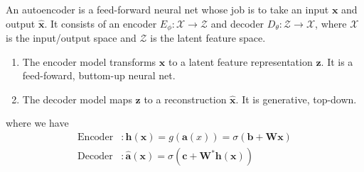 \documentclass{article}
\begin{document}
  \begin{definition}[Autoencoder]
    \label{def:autoencoder}
    An autoencoder is a feed-forward neural net whose job is to take an input $\mathbf{x}$ and output $\hat{\mathbf{x}}$. It consists of an encoder $E_\phi: \mathcal{X} \rightarrow \mathcal{Z}$ and decoder $D_\theta: \mathcal{Z} \rightarrow \mathcal{X}$, where $\mathcal{X}$ is the input/output space and $\mathcal{Z}$ is the latent feature space. 

    \begin{enumerate}
      \item The encoder model transforms $\mathbf{x}$ to a latent feature representation $\mathbf{z}$. It is a feed-foward, buttom-up neural net. 
      \item The decoder model maps $\mathbf{z}$ to a reconstruction $\hat{\mathbf{x}}$. It is generative, top-down. 
    \end{enumerate}
    where we have 
    \begin{align*} 
        \mathrm{Encoder} & : \mathbf{h}(\mathbf{x}) = g(\mathbf{a}(x)) = \sigma (\mathbf{b} + \mathbf{W} \mathbf{x}) \\
        \mathrm{Decoder} & : \hat{\mathbf{a}}(\mathbf{x}) = \sigma (\mathbf{c} + \mathbf{W}^\ast \mathbf{h}(\mathbf{x})) 
    \end{align*} 
    \begin{figure}[H]
      \centering 
\end{figure}
\end{definition}
\end{document}
